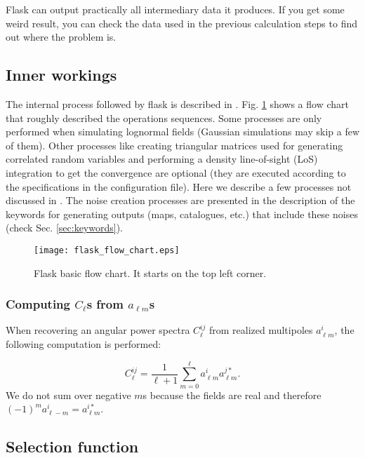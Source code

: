 \documentclass[12pt]{book} %
\begin{document}
{\sc Flask} can output practically all intermediary data it produces. If you get some 
weird result, you can check the data used in the previous calculation steps to 
find out where the problem is. 
   

\subsection{Inner workings}
\label{sec:workings}

The internal process followed by {\sc flask} is described in \citet{Xavier16mn}. 
Fig. \ref{fig:flow-chart} shows a flow chart that roughly described the 
operations sequences. Some processes are only performed when simulating lognormal 
fields (Gaussian simulations may skip a few of them). Other processes like 
creating triangular matrices used for generating correlated random variables and 
performing a density line-of-sight (LoS) integration to get the convergence are 
optional (they are executed according to the specifications in the configuration file).
Here we describe a few processes not discussed in \citet{Xavier16mn}. The noise 
creation processes are presented in the description of the keywords for generating 
outputs (maps, catalogues, etc.) that include these noises (check Sec. \ref{sec:keywords}).  

\begin{figure}
  \texttt{[image: flask\_flow\_chart.eps]}
  \caption{{\sc Flask} basic flow chart. It starts on the top left corner.}
\label{fig:flow-chart}  
\end{figure}

\subsubsection{Computing $C_\ell$s from $a_{\ell m}$s}

When recovering an angular power spectra $C_\ell^{ij}$ from realized multipoles $a_{\ell m}^{i}$, 
the following computation is performed:

\begin{equation}
C_\ell^{ij} = \frac{1}{\ell+1}\sum_{m=0}^\ell a_{\ell m}^{i}a_{\ell m}^{j*}.
\label{eq:recov-cl}
\end{equation}
We do not sum over negative $m$s because the fields are real and therefore 
$(-1)^m a_{\ell -m}^{i} = a_{\ell m}^{i*}$.

\subsection{Selection function}
\label{sec:selection}
\end{document}
